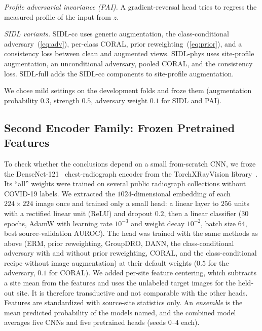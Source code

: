 \documentclass[journal]{IEEEtran}
\newcommand{\erm}{ERM}
\begin{document}
\emph{Profile adversarial invariance (PAI).} A gradient-reversal head tries to regress the measured profile of the input from $z$.

\emph{SIDL variants.} SIDL-cc uses generic augmentation, the class-conditional adversary~(\ref{eq:adv}), per-class CORAL, prior reweighting~(\ref{eq:prior}), and a consistency loss between clean and augmented views. SIDL-phys uses site-profile augmentation, an unconditional adversary, pooled CORAL, and the consistency loss. SIDL-full adds the SIDL-cc components to site-profile augmentation.

We chose mild settings on the development folds and froze them (augmentation probability $0.3$, strength $0.5$, adversary weight $0.1$ for SIDL and PAI).

\subsection{Second Encoder Family: Frozen Pretrained Features}\label{sec:second}
To check whether the conclusions depend on a small from-scratch CNN, we froze the DenseNet-121~\cite{huang2017densely} chest-radiograph encoder from the TorchXRayVision library~\cite{cohen2022torchxrayvision}. Its ``all'' weights were trained on several public radiograph collections without COVID-19 labels. We extracted the $1024$-dimensional embedding of each $224\times224$ image once and trained only a small head: a linear layer to $256$ units with a rectified linear unit (ReLU) and dropout $0.2$, then a linear classifier ($30$ epochs, AdamW with learning rate $10^{-3}$ and weight decay $10^{-2}$, batch size $64$, best source-validation AUROC). The head was trained with the same methods as above (\erm{}, prior reweighting, GroupDRO, DANN, the class-conditional adversary with and without prior reweighting, CORAL, and the class-conditional recipe without image augmentation) at their default weights ($0.5$ for the adversary, $0.1$ for CORAL). We added per-site feature centering, which subtracts a site mean from the features and uses the unlabeled target images for the held-out site. It is therefore transductive and not comparable with the other heads. Features are standardized with source-site statistics only. An \emph{ensemble} is the mean predicted probability of the models named, and the combined model averages five CNNs and five pretrained heads (seeds $0$--$4$ each).
\end{document}
